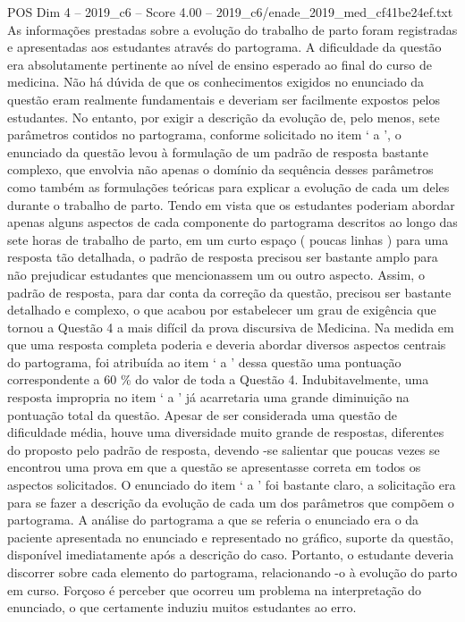 \begin{textsample}{POS Dim 4 – 2019\_c6 – Score 4.00 – 2019\_c6/enade\_2019\_med\_cf41be24ef.txt}
As informações prestadas sobre a evolução do trabalho de parto foram registradas e apresentadas aos estudantes através do partograma.
A dificuldade da questão era absolutamente pertinente ao nível de ensino esperado ao final do curso de medicina.
Não há dúvida de que os conhecimentos exigidos no enunciado da questão eram realmente fundamentais e deveriam ser facilmente expostos pelos estudantes.
No entanto, por exigir a descrição da evolução de, pelo menos, sete parâmetros contidos no partograma, conforme solicitado no item ‘ a ’, o enunciado da questão levou à formulação de um padrão de resposta bastante complexo, que envolvia não apenas o domínio da sequência desses parâmetros como também as formulações teóricas para explicar a evolução de cada um deles durante o trabalho de parto.
Tendo em vista que os estudantes poderiam abordar apenas alguns aspectos de cada componente do partograma descritos ao longo das sete horas de trabalho de parto, em um curto espaço ( poucas linhas ) para uma resposta tão detalhada, o padrão de resposta precisou ser bastante amplo para não prejudicar estudantes que mencionassem um ou outro aspecto.
Assim, o padrão de resposta, para dar conta da correção da questão, precisou ser bastante detalhado e complexo, o que acabou por estabelecer um grau de exigência que tornou a Questão 4 a mais difícil da prova discursiva de Medicina.
Na medida em que uma resposta completa poderia e deveria abordar diversos aspectos centrais do partograma, foi atribuída ao item ‘ a ’ dessa questão uma pontuação correspondente a 60 \% do valor de toda a Questão 4.
Indubitavelmente, uma resposta impropria no item ‘ a ’ já acarretaria uma grande diminuição na pontuação total da questão.
Apesar de ser considerada uma questão de dificuldade média, houve uma diversidade muito grande de respostas, diferentes do proposto pelo padrão de resposta, devendo -se salientar que poucas vezes se encontrou uma prova em que a questão se apresentasse correta em todos os aspectos solicitados.
O enunciado do item ‘ a ’ foi bastante claro, a solicitação era para se fazer a descrição da evolução de cada um dos parâmetros que compõem o partograma.
A análise do partograma a que se referia o enunciado era o da paciente apresentada no enunciado e representado no gráfico, suporte da questão, disponível imediatamente após a descrição do caso.
Portanto, o estudante deveria discorrer sobre cada elemento do partograma, relacionando -o à evolução do parto em curso.
Forçoso é perceber que ocorreu um problema na interpretação do enunciado, o que certamente induziu muitos estudantes ao erro.

\end{textsample}
